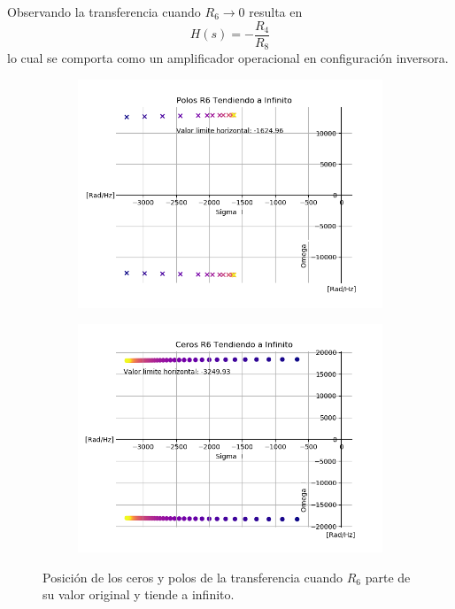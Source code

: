 Observando la transferencia cuando $R_6 \rightarrow 0$ resulta en
\begin{equation}
H(s)=-\frac{R_4}{R_8}
\label{ec:r6a0}
\end{equation}
lo cual se comporta como un amplificador operacional en configuración inversora.

\begin{figure}[H]
	\centering
	\begin{subfigure}[t]{0.49\textwidth}
	\hspace*{-2cm}
	\centering
		\includegraphics[width=1.1\textwidth]{Imagenes1/polosr6ainf.png}
	\end{subfigure}
	\begin{subfigure}[t]{0.49\textwidth}
	\centering
		\includegraphics[width=1.1\textwidth]{Imagenes1/cerosr6ainf.png}
	\end{subfigure}
	\caption{Posición de los ceros y polos de la transferencia cuando $R_6$ parte de su valor original y tiende a infinito.}
	\label{fig:r6ainf}
\end{figure}

